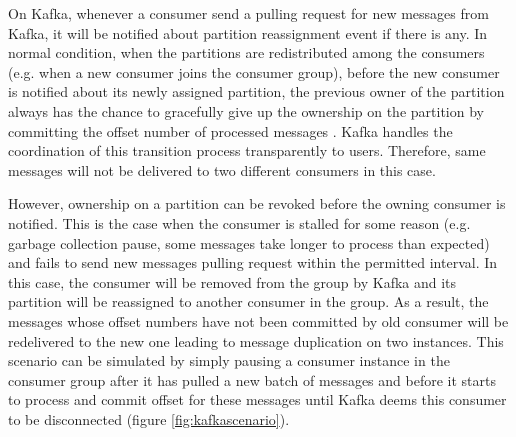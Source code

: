On Kafka, whenever a consumer send a pulling request for new messages from Kafka, it will be notified about partition reassignment event if there is any. In normal condition, when the partitions are redistributed among the consumers (e.g. when a new consumer joins the consumer group), before the new consumer is notified about its newly assigned partition, the previous owner of the partition always has the chance to gracefully give up the ownership on the partition by committing the offset number of processed messages \cite{kafkaconsumerimplement}. Kafka handles the coordination of this transition process transparently to users. Therefore, same messages will not be delivered to two different consumers in this case. 

However, ownership on a partition can be revoked before the owning consumer is notified. This is the case when the consumer is stalled for some reason (e.g. garbage collection pause, some messages take longer to process than expected) and fails to send new messages pulling request within the permitted interval. In this case, the consumer will be removed from the group by Kafka and its partition will be reassigned to another consumer in the group. As a result, the messages whose offset numbers have not been committed by old consumer will be redelivered to the new one leading to message duplication on two instances. This scenario can be simulated by simply pausing a consumer instance in the consumer group after it has pulled a new batch of messages and before it starts to process and commit offset for these messages until Kafka deems this consumer to be disconnected (figure \ref{fig:kafkascenario}). 

